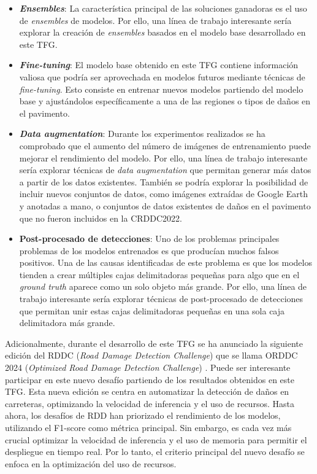 \begin{itemize}
    \item \textbf{\textit{Ensembles}}: La característica principal de las soluciones ganadoras es el uso de \textit{ensembles} de modelos. Por ello, una línea de trabajo interesante sería explorar la creación de \textit{ensembles} basados en el modelo base desarrollado en este TFG.
    \item \textbf{\textit{Fine-tuning}}: El modelo base obtenido en este TFG contiene información valiosa que podría ser aprovechada en modelos futuros mediante técnicas de \textit{fine-tuning}. Esto consiste en entrenar nuevos modelos partiendo del modelo base y ajustándolos específicamente a una de las regiones o tipos de daños en el pavimento.
    \item \textbf{\textit{Data augmentation}}: Durante los experimentos realizados se ha comprobado que el aumento del número de imágenes de entrenamiento puede mejorar el rendimiento del modelo. Por ello, una línea de trabajo interesante sería explorar técnicas de \textit{data augmentation} que permitan generar más datos a partir de los datos existentes. También se podría explorar la posibilidad de incluir nuevos conjuntos de datos, como imágenes extraídas de Google Earth y anotadas a mano, o conjuntos de datos existentes de daños en el pavimento que no fueron incluidos en la CRDDC2022.
    \item \textbf{Post-procesado de detecciones}: Uno de los problemas principales problemas de los modelos entrenados es que producían muchos falsos positivos. Una de las causas identificadas de este problema es que los modelos tienden a crear múltiples cajas delimitadoras pequeñas para algo que en el \textit{ground truth} aparece como un solo objeto más grande. Por ello, una línea de trabajo interesante sería explorar técnicas de post-procesado de detecciones que permitan unir estas cajas delimitadoras pequeñas en una sola caja delimitadora más grande.
\end{itemize}

Adicionalmente, durante el desarrollo de este TFG se ha anunciado la siguiente edición del RDDC (\textit{Road Damage Detection Challenge}) que se llama ORDDC 2024 (\textit{Optimized Road Damage Detection Challenge}) \cite{ORDDC2024}. Puede ser interesante participar en este nuevo desafío partiendo de los resultados obtenidos en este TFG. Esta nueva edición se centra en automatizar la detección de daños en carreteras, optimizando la velocidad de inferencia y el uso de recursos. Hasta ahora, los desafíos de RDD han priorizado el rendimiento de los modelos, utilizando el F1-score como métrica principal. Sin embargo, es cada vez más crucial optimizar la velocidad de inferencia y el uso de memoria para permitir el despliegue en tiempo real. Por lo tanto, el criterio principal del nuevo desafío se enfoca en la optimización del uso de recursos.

